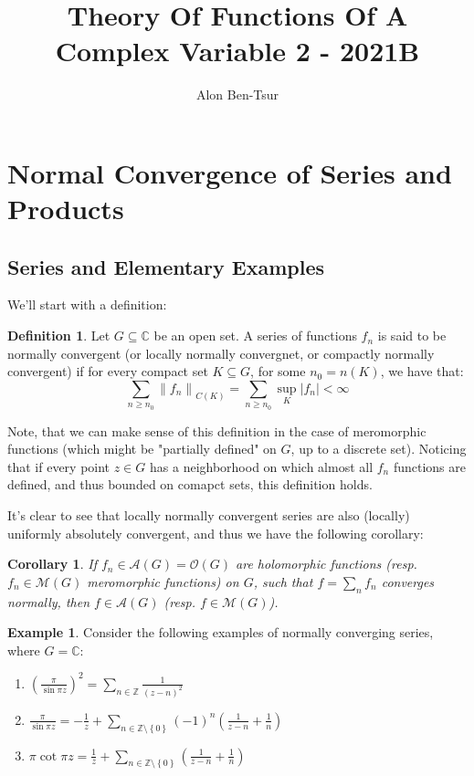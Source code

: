 \documentclass[11pt]{article} %
\title{Theory Of Functions Of A Complex Variable 2 - 2021B}
\author{Alon Ben-Tsur}
\newtheorem{corollary}[theorem]{Corollary}
\theoremstyle{definition}
\newtheorem{definition}[theorem]{Definition}
\newtheorem{example}[theorem]{Example}
\begin{document}
\maketitle

\section{Normal Convergence of Series and Products}

\subsection{Series and Elementary Examples}

We'll start with a definition:

\begin{definition}
Let $G \subseteq \mathbb{C}$ be an open set. A series of functions $f_n$ is said to be normally convergent (or locally normally convergnet, or compactly normally convergent) if for every compact set $K \subseteq G$, for some $n_0 = n\left(K\right)$, we have that:
\[ \sum _{n \geq n_0} \left\lVert f_n \right\rVert_{C\left(K\right)} = \sum _{n \geq n_0} \sup _K \left|f_n\right| < \infty \]
\end{definition}

Note, that we can make sense of this definition in the case of meromorphic functions (which might be "partially defined" on $G$, up to a discrete set). Noticing that if every point $z \in G$ has a neighborhood on which almost all $f_n$ functions are defined, and thus bounded on comapct sets, this definition holds.

It's clear to see that locally normally convergent series are also (locally) uniformly absolutely convergent, and thus we have the following corollary:

\begin{corollary}
If $f_n \in \mathcal{A}\left(G\right) = \mathcal{O}\left(G\right)$ are holomorphic functions (resp. $f_n \in \mathcal{M}\left(G\right)$ meromorphic functions) on $G$, such that $f = \sum_n f_n$ converges normally, then $f \in \mathcal{A}\left(G\right)$ (resp. $f \in \mathcal{M}\left(G\right)$).
\end{corollary}

\begin{example}
Consider the following examples of normally converging series, where $G = \mathbb{C}$:

\begin{enumerate}
\item $\left(\frac{\pi}{\sin\pi z}\right)^2 = \sum_{n\in\mathbb{Z}} \frac{1}{\left(z-n\right)^2}$
\item $\frac{\pi}{\sin\pi z}= -\frac{1}{z} + \sum_{n\in\mathbb{Z}\setminus\left\{0\right\}}\left(-1\right)^n \left(\frac{1}{z-n} + \frac{1}{n}\right)$
\item $\pi \cot \pi z =  \frac{1}{z} + \sum_{n\in\mathbb{Z}\setminus\left\{0\right\}} \left(\frac{1}{z-n} + \frac{1}{n}\right)$
\end{enumerate}
\end{example}
\end{document}
